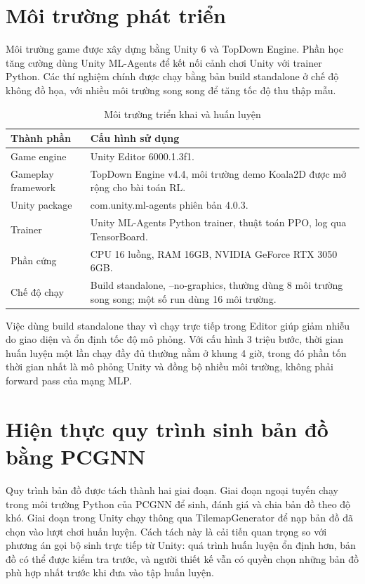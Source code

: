 \section{Môi trường phát triển}

Môi trường game được xây dựng bằng Unity 6 và TopDown Engine. Phần học tăng cường dùng Unity ML-Agents để kết nối cảnh chơi Unity với trainer Python. Các thí nghiệm chính được chạy bằng bản build standalone ở chế độ không đồ họa, với nhiều môi trường song song để tăng tốc độ thu thập mẫu.

\begin{table}[H]
    \centering
    \small
    \caption{Môi trường triển khai và huấn luyện}
    \label{tab:development_environment}
    \begin{tabular}{|p{5cm}|p{8cm}|}
        \hline
        \textbf{Thành phần} & \textbf{Cấu hình sử dụng} \\
        \hline
        Game engine & Unity Editor 6000.1.3f1. \\
        \hline
        Gameplay framework & TopDown Engine v4.4, môi trường demo Koala2D được mở rộng cho bài toán RL. \\
        \hline
        Unity package & com.unity.ml-agents phiên bản 4.0.3. \\
        \hline
        Trainer & Unity ML-Agents Python trainer, thuật toán PPO, log qua TensorBoard. \\
        \hline
        Phần cứng & CPU 16 luồng, RAM 16GB, NVIDIA GeForce RTX 3050 6GB. \\
        \hline
        Chế độ chạy & Build standalone, --no-graphics, thường dùng 8 môi trường song song; một số run dùng 16 môi trường. \\
        \hline
    \end{tabular}
\end{table}

Việc dùng build standalone thay vì chạy trực tiếp trong Editor giúp giảm nhiễu do giao diện và ổn định tốc độ mô phỏng. Với cấu hình 3 triệu bước, thời gian huấn luyện một lần chạy đầy đủ thường nằm ở khung 4 giờ, trong đó phần tốn thời gian nhất là mô phỏng Unity và đồng bộ nhiều môi trường, không phải forward pass của mạng MLP.

\section{Hiện thực quy trình sinh bản đồ bằng PCGNN}

Quy trình bản đồ được tách thành hai giai đoạn. Giai đoạn ngoại tuyến chạy trong môi trường Python của PCGNN để sinh, đánh giá và chia bản đồ theo độ khó. Giai đoạn trong Unity chạy thông qua TilemapGenerator để nạp bản đồ đã chọn vào lượt chơi huấn luyện. Cách tách này là cải tiến quan trọng so với phương án gọi bộ sinh trực tiếp từ Unity: quá trình huấn luyện ổn định hơn, bản đồ có thể được kiểm tra trước, và người thiết kế vẫn có quyền chọn những bản đồ phù hợp nhất trước khi đưa vào tập huấn luyện.


